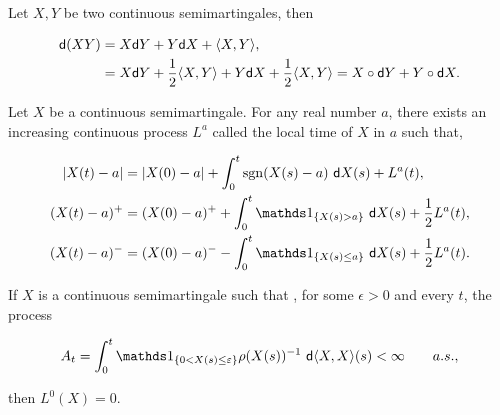 \begin{theorem} \label{thm:partes} 
    Let $X, Y$ be two continuous semimartingales, then

    \begin{align*}
        \mathsf d(XY) &= X \mathsf d Y + Y \mathsf d X + \langle X, Y \rangle,\\
        &= X \mathsf d Y + \frac12\langle X, Y \rangle + Y \mathsf d X + \frac12\langle X, Y \rangle = X \circ \mathsf d Y + Y \circ \mathsf d X.
    \end{align*}
\end{theorem}





\begin{theorem} 
    Let $X$ be a continuous semimartingale. For any real number $a$, there exists an increasing continuous process $L^a$ called the local time of $X$ in $a$ such that,


    \begin{align*}
        \abs{X(t) - a} &= \abs{X(0) - a} + \int_0^t \mathrm{sgn}(X(s) - a)~\d X(s) + L^a(t),\\
        (X(t) - a)^+ &= (X(0) - a)^+ + \int_0^t \mathds 1_{\{X(s) > a\}}~\d X(s) + \frac12 L^a(t),\\
        (X(t) - a)^- &= (X(0) - a)^- - \int_0^t \mathds 1_{\{X(s) \le a\}}~\d X(s) + \frac12 L^a(t).
    \end{align*}

\end{theorem}


\begin{theorem} \label{thm:local_zero} 
    If $X$ is a continuous semimartingale such that , for some $\epsilon > 0$ and every $t$, the process

    \begin{equation*}
        A_t = \int_0^t \mathds 1_{\{0 < X(s) \le \epsilon\}} \rho(X(s))^{-1} ~\d \langle X, X \rangle (s) < \infty \qquad a.s.,
    \end{equation*}

    \noindent then $L^0(X) = 0$.
\end{theorem}


